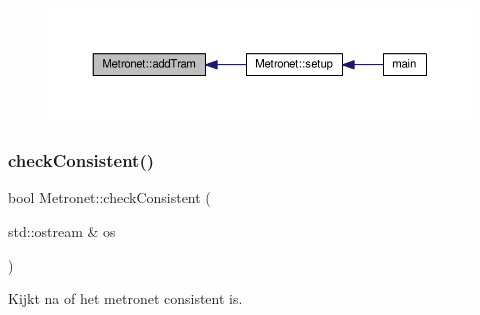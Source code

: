 \begin{figure}[H]
\begin{center}
\leavevmode
\includegraphics[width=350pt]{class_metronet_a3a01132772f4a367d83af40a3c02e224_icgraph}
\end{center}
\end{figure}
\mbox{\label{class_metronet_a3125e980b208f1cdd04a9c26ec92a7bf}} 
\subsubsection{\texorpdfstring{check\+Consistent()}{checkConsistent()}}
{\footnotesize\ttfamily bool Metronet\+::check\+Consistent (\begin{DoxyParamCaption}\item[{std\+::ostream \&}]{os }\end{DoxyParamCaption})}



Kijkt na of het metronet consistent is. 


